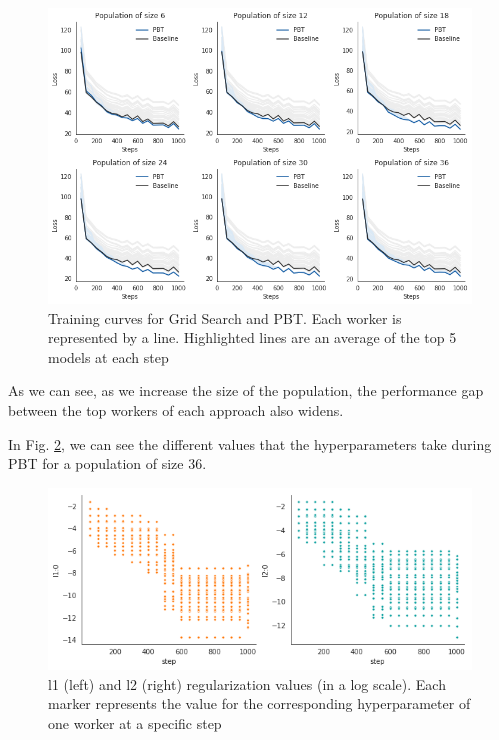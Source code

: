 \documentclass{article}
\begin{document}
\begin{figure}[H]
    \label{fig:training-curves}
    \centering
    \includegraphics[width=\textwidth,height=\textheight,keepaspectratio]{training_curves}
    \caption{Training curves for Grid Search and PBT. Each worker is represented by a line. Highlighted lines are an average of the top 5 models at each step}
\end{figure}

As we can see, as we increase the size of the population, the performance gap between the top workers of each approach also widens.

In Fig. \ref{fig:hyp}, we can see the different values that the
hyperparameters take during PBT for a population of size 36.

\begin{figure}[H]
    \label{fig:hyp}
    \centering
    \includegraphics[width=\textwidth,height=\textheight,keepaspectratio]{hyperparameter_population.png}
    \caption{l1 (left) and l2 (right) regularization values (in a log scale). Each marker represents the value for the corresponding hyperparameter of one worker at a specific step}
\end{figure}
\end{document}

